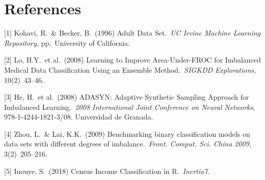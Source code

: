 \documentclass{article}
\begin{document}
\section*{References}

\medskip

\small

[1] Kohavi, R.\ \& Becker, B.\ (1996) Adult Data Set.\ {\it UC Irvine Machine Learning Repository},
pp.\ University of California.

[2] Lo, H.Y.\ et al.\ (2008) Learning to Improve Area-Under-FROC for Imbalanced Medical Data Classification Using an Ensemble Method.\ {\it SIGKDD Explorations},
10(2)\ 43--46.

[3] He, H.\ et al.\ (2008) ADASYN: Adaptive Synthetic Sampling Approach for Imbalanced
Learning.\ {\it 2008 International Joint Conference on Neural Networks}, 978-1-4244-1821-3/08. Universidad de Granada.

[4] Zhou, L.\ \& Lai, K.K.\ (2009) Benchmarking binary classification models on data sets with different degrees of imbalance.\ {\it Front. Comput. Sci. China 2009},
3(2)\ 205--216.

[5] Inouye, S.\ (2018) Census Income Classification in R.\ {\it Inertia7}.
\end{document}

